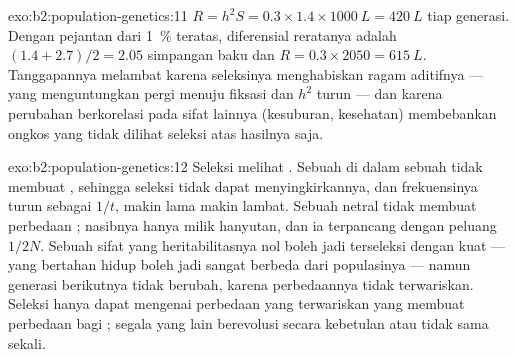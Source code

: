 \begin{solution}{exo:b2:population-genetics:11}
$R = h^{2}S = 0.3\times 1.4\times \qty{1000}{L} = \qty{420}{L}$ tiap
generasi. Dengan pejantan dari \qty{1}{\%} teratas, diferensial
reratanya adalah $(1.4 + 2.7)/2 = 2.05$ simpangan baku dan $R =
0.3\times 2050 = \qty{615}{L}$. Tanggapannya melambat karena seleksinya
menghabiskan ragam aditifnya ---  yang menguntungkan pergi menuju
fiksasi dan $h^{2}$ turun --- dan karena perubahan berkorelasi pada
sifat lainnya (kesuburan, kesehatan) membebankan ongkos yang tidak
dilihat seleksi atas hasilnya saja.
\end{solution}

\begin{solution}{exo:b2:population-genetics:12}
Seleksi melihat . Sebuah   di dalam sebuah
 tidak membuat , sehingga seleksi tidak dapat
menyingkirkannya, dan frekuensinya turun sebagai $1/t$, makin lama
makin lambat. Sebuah  netral tidak membuat perbedaan ;
nasibnya hanya milik hanyutan, dan ia terpancang dengan peluang $1/2N$.
Sebuah sifat yang heritabilitasnya nol boleh jadi terseleksi dengan
kuat --- yang bertahan hidup boleh jadi sangat berbeda dari
populasinya --- namun generasi berikutnya tidak berubah, karena
perbedaannya tidak terwariskan. Seleksi hanya dapat mengenai perbedaan
yang terwariskan yang membuat perbedaan bagi ; segala yang
lain berevolusi secara kebetulan atau tidak sama sekali.
\end{solution}

